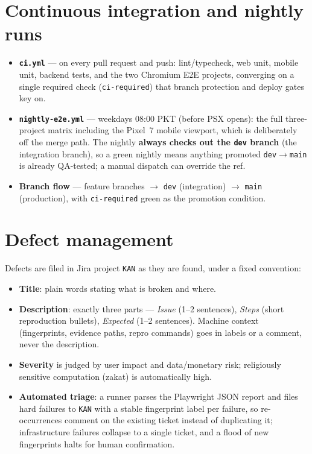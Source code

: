 \documentclass[11pt,a4paper]{article}
\begin{document}
\section{Continuous integration and nightly runs}\label{sec:ci}

\begin{itemize}
  \item \textbf{\texttt{ci.yml}} --- on every pull request and push: lint/typecheck,
        web unit, mobile unit, backend tests, and the two Chromium E2E
        projects, converging on a single required check (\texttt{ci-required})
        that branch protection and deploy gates key on.
  \item \textbf{\texttt{nightly-e2e.yml}} --- weekdays 08:00 PKT (before PSX opens):
        the full three-project matrix including the Pixel~7 mobile viewport,
        which is deliberately off the merge path. The nightly \textbf{always checks
        out the \texttt{dev} branch} (the integration branch), so a green nightly
        means anything promoted \texttt{dev}$\rightarrow$\texttt{main} is already
        QA-tested; a manual dispatch can override the ref.
  \item \textbf{Branch flow} --- feature branches $\rightarrow$ \texttt{dev}
        (integration) $\rightarrow$ \texttt{main} (production), with
        \texttt{ci-required} green as the promotion condition.
\end{itemize}

\section{Defect management}\label{sec:defects}

Defects are filed in Jira project \texttt{KAN} as they are found, under a fixed
convention:

\begin{itemize}
  \item \textbf{Title}: plain words stating what is broken and where.
  \item \textbf{Description}: exactly three parts --- \emph{Issue} (1--2 sentences),
        \emph{Steps} (short reproduction bullets), \emph{Expected} (1--2 sentences).
        Machine context (fingerprints, evidence paths, repro commands) goes in
        labels or a comment, never the description.
  \item \textbf{Severity} is judged by user impact and data/monetary risk;
        religiously sensitive computation (zakat) is automatically high.
  \item \textbf{Automated triage}: a runner parses the Playwright JSON report and
        files hard failures to \texttt{KAN} with a stable fingerprint label per
        failure, so re-occurrences comment on the existing ticket instead of
        duplicating it; infrastructure failures collapse to a single ticket,
        and a flood of new fingerprints halts for human confirmation.
\end{itemize}
\end{document}
